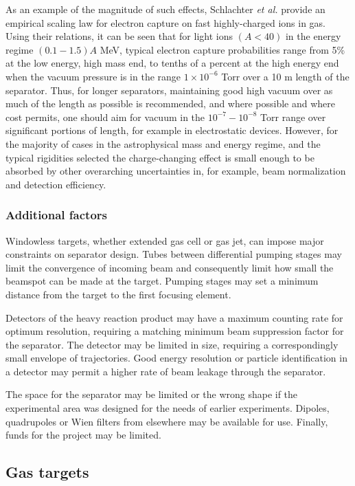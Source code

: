 As an example of the magnitude of such effects, Schlachter {\em et al.} \cite{sch83} provide an empirical scaling law for electron capture on fast highly-charged ions in gas. Using their relations, it can be seen that for light ions $(A<40)$ in the energy regime $(0.1-1.5)A$ MeV, typical electron capture probabilities range from 5\% at the low energy, high mass end, to tenths of a percent at the high energy end when the vacuum pressure is in the range $1\times10^{-6}$ Torr over a 10 m length of the separator. Thus, for longer separators, maintaining good high vacuum over as much of the length as possible is recommended, and where possible and where cost permits, one should aim for vacuum in the $10^{-7}-10^{-8}$ Torr range over significant portions of length, for example in electrostatic devices. However, for the majority of cases in the astrophysical mass and energy regime, and the typical rigidities selected the charge-changing effect is small enough to be absorbed by other overarching uncertainties in, for example, beam normalization and detection efficiency. 



\subsubsection{Additional factors} 
 Windowless targets, whether extended gas cell or gas jet, can impose major constraints on separator design.  Tubes between differential pumping stages may limit the convergence of incoming beam and consequently limit how small the beamspot  can be made at the target.  Pumping stages may set a minimum distance from the target to the first focusing element.

Detectors of the heavy reaction product may have a maximum counting rate for optimum resolution, requiring a matching minimum beam suppression factor for the separator.   The detector may be limited in size, requiring a correspondingly small envelope of trajectories.    Good energy resolution or particle identification in a detector may permit a higher rate of beam leakage through the separator.

 The space   for the separator may be limited or the wrong shape if the experimental area was designed for the needs of earlier experiments.   Dipoles, quadrupoles  or Wien filters from elsewhere  may be available for use.  Finally,  funds for the project may be limited.   

\subsection{Gas targets}
\label{gas}

